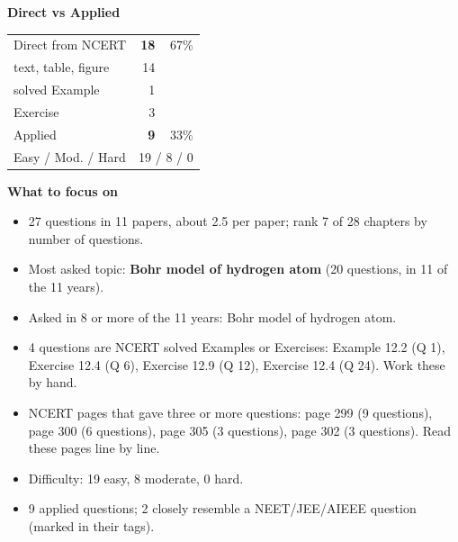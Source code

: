 \begin{minipage}[t]{0.34\linewidth}{\small\textbf{\color{crimson}Direct vs Applied}\par\smallskip
\begin{tabular}{@{}lrr@{}}\toprule
Direct from NCERT & \textbf{18} & 67\%\\
\quad text, table, figure & 14 &\\
\quad solved Example & 1 &\\
\quad Exercise & 3 &\\
Applied & \textbf{9} & 33\%\\\midrule
Easy / Mod. / Hard & \multicolumn{2}{r}{19 / 8 / 0}\\\bottomrule
\end{tabular}}\end{minipage}\hfill
\begin{minipage}[t]{0.63\linewidth}{\small\textbf{\color{crimson}What to focus on}\par\smallskip
\begin{itemize}[leftmargin=1.1em,itemsep=1pt,topsep=0pt]
\item 27 questions in 11 papers, about 2.5 per paper; rank 7 of 28 chapters by number of questions.
\item Most asked topic: \textbf{Bohr model of hydrogen atom} (20 questions, in 11 of the 11 years).
\item Asked in 8 or more of the 11 years: Bohr model of hydrogen atom.
\item 4 questions are NCERT solved Examples or Exercises: Example 12.2 (Q 1), Exercise 12.4 (Q 6), Exercise 12.9 (Q 12), Exercise 12.4 (Q 24). Work these by hand.
\item NCERT pages that gave three or more questions: page 299 (9 questions), page 300 (6 questions), page 305 (3 questions), page 302 (3 questions). Read these pages line by line.
\item Difficulty: 19 easy, 8 moderate, 0 hard.
\item 9 applied questions; 2 closely resemble a NEET/JEE/AIEEE question (marked in their tags).
\end{itemize}}\end{minipage}\par
{}
